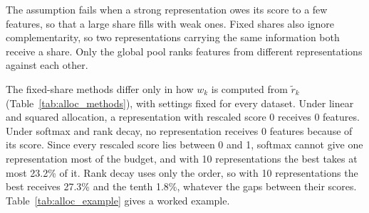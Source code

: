 The assumption fails when a strong representation owes its score to a few features, so that a large share fills with weak ones. Fixed shares also ignore complementarity, so two representations carrying the same information both receive a share. Only the global pool ranks features from different representations against each other.


The fixed-share methods differ only in how $w_k$ is computed from $\tilde r_k$ (Table~\ref{tab:alloc_methods}), with settings fixed for every dataset. Under linear and squared allocation, a representation with rescaled score 0 receives 0 features. Under softmax and rank decay, no representation receives 0 features because of its score. Since every rescaled score lies between 0 and 1, softmax cannot give one representation most of the budget, and with 10 representations the best takes at most 23.2\% of it. Rank decay uses only the order, so with 10 representations the best receives 27.3\% and the tenth 1.8\%, whatever the gaps between their scores. Table~\ref{tab:alloc_example} gives a worked example.

